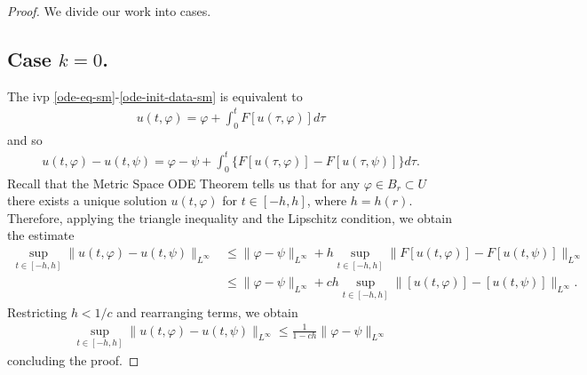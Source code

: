 \documentclass[12pt,reqno]{amsart}
\numberwithin{equation}{section}  %
\newcommand{\vp}{\varphi}
\begin{document}
\begin{proof}
  We divide our work into cases.
  \subsection*{Case $k = 0$.} The ivp \eqref{ode-eq-sm}-\eqref{ode-init-data-sm} is equivalent to 
  \begin{equation*}
  \begin{split}
  u(t, \vp) = \vp + \int_{0}^{t} F[u(\tau, \vp)] d \tau
  \end{split}
  \end{equation*}
  and so
  \begin{equation*}
    \begin{split}
  u(t, \vp) - u(t, \psi) = \vp - \psi + \int_{0}^{t} \{F[u(\tau, \vp)] - F[u(\tau, \psi)]\} d \tau.
  \end{split}
  \end{equation*}
 Recall that the Metric Space ODE Theorem tells us that for any $\vp \in B_{r} \subset U$ there exists a unique solution $u(t, \vp)$ for $t \in [-h, h]$, where $h = h(r)$. Therefore, applying the triangle inequality and the Lipschitz condition, we obtain the estimate
  \begin{equation*}
  \begin{split}
  \sup_{t \in [-h, h]} \|u(t, \vp) - u(t, \psi)\|_{L^{\infty}}
  & \le \|\vp -
  \psi\|_{L^{\infty}} +  h \sup_{t \in [-h, h]} \|F[u(t, \vp)] - F[u(t, \psi)] \|_{L^{\infty}}
  \\
  & \le \|\vp - \psi\|_{L^{\infty}} +  ch \sup_{t \in [-h, h]} \|[u(t, \vp)] -
  [u(t, \psi)] \|_{L^{\infty}}.
  \end{split}
  \end{equation*}
Restricting $h < 1/c$ and rearranging terms, we obtain
%
%
\begin{equation*}
\begin{split}
\sup_{t \in [-h, h]} \| u(t, \vp) - u(t, \psi) \|_{L^{\infty}} \le \frac{1}{1-ch} \| \vp - \psi \|_{L^{\infty}}
\end{split}
\end{equation*}
%
%
concluding the proof.

\end{proof}
\end{document}
